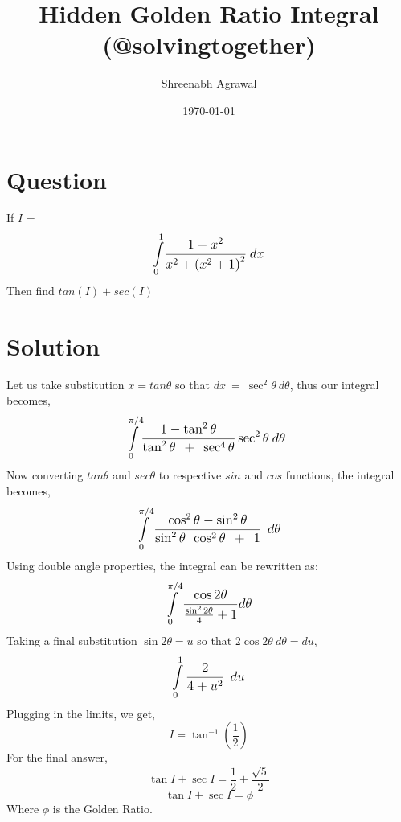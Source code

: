 \documentclass{article}
\title{Hidden Golden Ratio Integral (@solvingtogether)}
\author{Shreenabh Agrawal}
\date{\today}
\begin{document}
\maketitle

\section{Question}

If $I$ = $$\mathlarger{\LARGE{{\int\limits_{0}^{1}}\frac{1-x^{2}}{x^{2}+\left(x^{2}+1\right)^{2}}\: dx}} $$
Then find $tan(I) + sec(I)$

\section{Solution}

Let us take substitution $x = tan \theta$ so that $dx\ =\ \sec^{2}\theta\ d\theta$, thus our integral becomes,
$$\mathlarger{\LARGE{\int\limits_{0}^{\pi/4}}\frac{1-\tan^{2}\theta}{\tan^{2}\theta\ +\ \sec^{4}\theta}\sec^{2}\theta\: d\theta\ } $$
Now converting $tan \theta$ and $sec \theta$ to respective $sin$ and $cos$ functions, the integral becomes,
$$\mathlarger{\LARGE{\int\limits_{0}^{\pi/4}\frac{\cos^{2}\theta-\sin^{2}\theta}{\sin^{2}\theta\ \cos^{2}\theta\ +\ 1}\ d\theta}} $$
Using double angle properties, the integral can be rewritten as:
$$\mathlarger{\LARGE{\int\limits_{0}^{\pi/4}\frac{\cos2\theta}{\frac{\sin^{2}2\theta}{4}+1} d\theta}} $$
Taking a final substitution $\sin2\theta=u$ so that $2\cos2\theta\ d\theta=du$,
$$\mathlarger{\LARGE{\int\limits_{0}^{1}\frac{2}{4+u^{2}}\ du}} $$
Plugging in the limits, we get,
$${I =\tan^{-1}\left(\frac{1}{2}\right)}$$
For the final answer,
$$\tan I+\sec I=\frac{1}{2}+\frac{\sqrt{5}}{2}$$
$$\boxed{\tan I+\sec I= \phi}$$
Where $\phi$ is the Golden Ratio.
\end{document}
